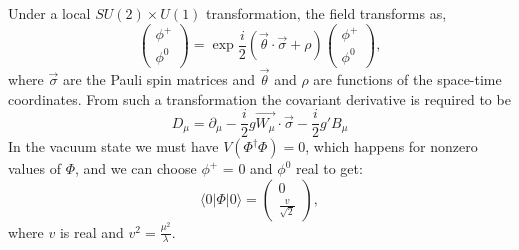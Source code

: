 Under a local $SU(2)\times U(1)$ transformation, the field transforms as,
\begin{equation}\label{eqn:hfield_trsf}
\begin{pmatrix} \phi^+ \\
\phi^0 \end{pmatrix} = \exp{\frac{i}{2}(\vec{\theta}\cdot\vec{\sigma} + \rho)}
\begin{pmatrix} \phi^+ \\
\phi^0 \end{pmatrix}, 
\end{equation}
where $\vec{\sigma}$ are the Pauli spin matrices and $\vec{\theta}$ and $\rho$
are functions of the space-time coordinates. From such a transformation
the covariant derivative is required to be
\begin{equation}\label{eqn:H_cov_deriv}
D_{\mu} = \partial_{\mu} - \frac{i}{2}g\vec{W_{\mu}}\cdot\vec{\sigma} - \frac{i}{2}g'B_{\mu}
\end{equation}
In the vacuum state we must have $V(\Phi^{\dagger}\Phi) =0$, which happens for nonzero values of $\Phi$,
and we can choose $\phi^+$ = 0 and $\phi^0$ real to get:
\begin{equation}\label{eqn:field_vev}
\langle 0 | \Phi | 0 \rangle = \begin{pmatrix} 0 \\
\frac{v}{\sqrt{2}} \end{pmatrix},
\end{equation}
where $v$ is real and $v^2 = \frac{\mu^2}{\lambda}$.

